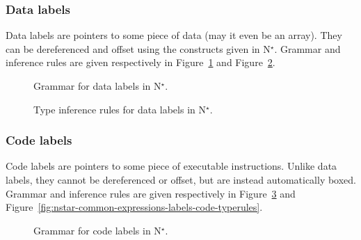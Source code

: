 \subsubsection{Data labels}\label{subsubsec:nstar-common-expressions-labels-data}

Data labels are pointers to some piece of data (may it even be an array).
They can be dereferenced and offset using the constructs given in N$^\star$.
Grammar and inference rules are given respectively in Figure~\ref{fig:nstar-common-expressions-labels-data-grammar} and Figure~\ref{fig:nstar-common-expressions-labels-data-typerules}.

\begin{figure}[H]
  \centering

  \caption{Grammar for data labels in N$^\star$.}
  \label{fig:nstar-common-expressions-labels-data-grammar}
\end{figure}

\begin{figure}[H]
  \centering

  \begin{prooftree}
  \end{prooftree}

  \caption{Type inference rules for data labels in N$^\star$.}
  \label{fig:nstar-common-expressions-labels-data-typerules}
\end{figure}

\subsubsection{Code labels}\label{subsubsec:nstar-common-expressions-labels-code}

Code labels are pointers to some piece of executable instructions.
Unlike data labels, they cannot be dereferenced or offset, but are instead automatically boxed.
Grammar and inference rules are given respectively in Figure~\ref{fig:nstar-common-expressions-labels-code-grammar} and Figure~\ref{fig:nstar-common-expressions-labels-code-typerules}.

\begin{figure}[H]
  \centering

  \caption{Grammar for code labels in N$^\star$.}
  \label{fig:nstar-common-expressions-labels-code-grammar}
\end{figure}

